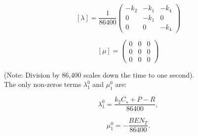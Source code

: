 $$  [\lambda] = \frac{1}{86400}
  \begin{pmatrix}
    -k_2 & -k_1  & -k_4 \\
     0   & -k_1  & 0    \\
     0   &  0    & -k_4
  \end{pmatrix}
$$
  
$$
  [\mu] = 
  \begin{pmatrix}
     0  & 0 & 0 \\
     0  & 0 & 0 \\
     0  & 0 & 0
  \end{pmatrix}
$$  

(Note: Division by 86,400 scales down the time to one second).\\

The only non-zeros terms $ \lambda_1^0$ and $ \mu_1^0$ are:

\begin{equation}
  \lambda_1^0 = \frac{k_2 C_s + P - R}{86400},
\end{equation}

\begin{equation}
  \mu_1^0 = -\frac{BEN_T}{86400}.
\end{equation}

